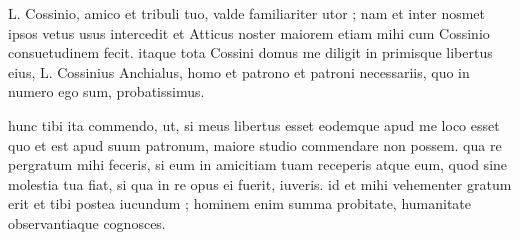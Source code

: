 


 L. Cossinio, amico et tribuli tuo, valde familiariter utor ; nam et inter nosmet ipsos vetus usus intercedit et Atticus noster maiorem etiam mihi cum Cossinio consuetudinem fecit. itaque tota Cossini domus me diligit in primisque libertus eius, L. Cossinius Anchialus, homo et patrono et patroni necessariis, quo in numero ego sum, probatissimus.

 hunc tibi ita commendo, ut, si meus libertus esset eodemque apud me loco esset quo et est apud suum patronum, maiore studio commendare non possem. qua re pergratum mihi feceris, si eum in amicitiam tuam receperis atque eum, quod sine molestia tua fiat, si qua in re opus ei fuerit, iuveris. id et mihi vehementer gratum erit et tibi postea iucundum ; hominem enim summa probitate, humanitate observantiaque cognosces.

